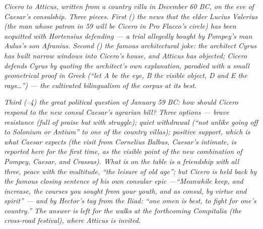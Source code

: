 
\textit{Cicero to Atticus, written from a country villa in
December 60 BC, on the eve of Caesar's consulship. Three
pieces. First () the news that the elder
Lucius Valerius (the man whose patron in 59 will be Cicero
in \textit{Pro Flacco}'s circle) has been acquitted with
Hortensius defending --- a trial allegedly bought by
Pompey's man Aulus's son Afranius. Second ()
the famous architectural joke: the architect Cyrus has built
narrow windows into Cicero's house, and Atticus has objected;
Cicero defends Cyrus by quoting the architect's own
explanation, parodied with a small geometrical proof in
Greek (``let A be the eye, B the visible object, D and E the
rays\ldots'') --- the cultivated bilingualism of the corpus
at its best.}

\textit{Third (--4) the great political
question of January 59 BC: how should Cicero respond to
the new consul Caesar's agrarian bill? Three options ---
brave resistance (full of praise but with struggle); quiet
withdrawal (``not unlike going off to Solonium or Antium''
to one of the country villas); positive support, which is
what Caesar expects (the visit from Cornelius Balbus,
Caesar's intimate, is reported here for the first time, as
the visible point of the new combination of Pompey,
Caesar, and Crassus). What is on the table is a friendship
with all three, peace with the multitude, ``the leisure of
old age''; but Cicero is held back by the famous closing
sentence of his own consular epic ---``Meanwhile keep, and
increase, the courses you sought from your youth, and as
consul, by virtue and spirit'' --- and by Hector's tag
from the Iliad: ``one omen is best, to fight for one's
country.'' The answer is left for the walks at the
forthcoming Compitalia (the cross-road festival), where
Atticus is invited.}
